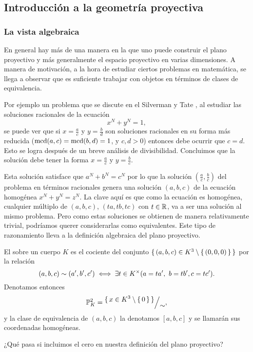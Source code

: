 \documentclass[12pt]{memoir}
\begin{document}
\subsection{Introducción a la geometría proyectiva}

\subsubsection{La vista algebraica}

En general hay más de una manera en la que uno puede construir el plano proyectivo y más generalmente el espacio proyectivo en varias dimensiones. A manera de motivación, a la hora de estudiar ciertos problemas en matemática, se llega a observar que es suficiente trabajar con objetos en términos de clases de equivalencia.\par
Por ejemplo un problema que se discute en el Silverman y Tate \cite{SilvermanTate}, al estudiar las soluciones racionales de la ecuación
$$x^N+y^N=1,$$
se puede ver que si $x=\frac ac$ y $y=\frac bd$ son soluciones racionales en su forma más reducida ($\operatorname{mcd}(a,c)=\operatorname{mcd}(b,d)=1$, y $c,d>0$) entonces debe ocurrir que $c=d$. Esto se logra después de un breve análisis de divisibilidad. Concluimos que la solución debe tener la forma $x=\frac ac$ y $y=\frac bc$.\par
Esta solución satisface que $a^N+b^N=c^N$ por lo que la solución $\left(\frac ac,\frac bc\right)$ del problema en términos racionales genera una solución $(a,b,c)$ de la ecuación homogénea $x^N+y^N=z^N$. La clave aquí es que como la ecuación es homogénea, cualquier múltiplo de $(a,b,c)$, $(ta,tb,tc)$ con $t\in\mathbb{R}$, va a ser una solución al mismo problema. Pero como estas soluciones se obtienen de manera relativamente trivial, podríamos querer considerarlas como equivalentes. Este tipo de razonamiento lleva a la definición algebraica del plano proyectivo.

\begin{Def}
  El  sobre un cuerpo $K$ es el cociente del conjunto $\{\,(a,b,c)\in K^3\setminus\{\,(0,0,0)\,\}\,\}$ por la relación
  $$(a,b,c)\sim (a',b',c')\iff \exists t\in K^\times(a=ta',\ b=tb', c=tc').$$
  Denotamos entonces
  $$\bP^2_K=\quot{\set{x\in K^3\less\set{0}}}{\sim},$$
  y la clase de equivalencia de $(a,b,c)$ la denotamos $[a,b,c]$ y se llamarán sus coordenadas homogéneas.
\end{Def}

\begin{significant}
  ¿Qué pasa si incluimos el cero en nuestra definición del plano proyectivo?
\end{significant}
\end{document}
